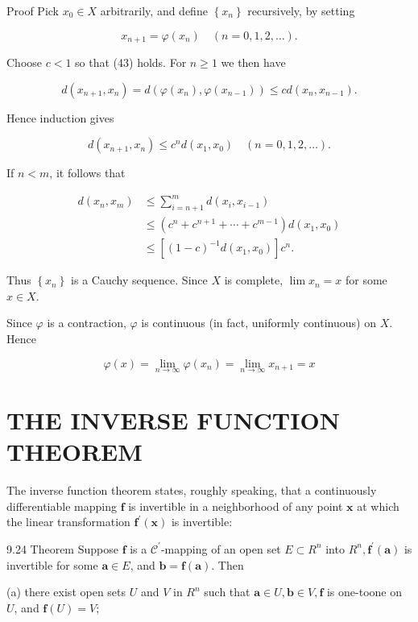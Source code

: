 \documentclass[10pt]{article}
\begin{document}
Proof Pick $x_{0} \in X$ arbitrarily, and define $\left\{x_{n}\right\}$ recursively, by setting

$$
x_{n+1}=\varphi\left(x_{n}\right) \quad(n=0,1,2, \ldots) .
$$

Choose $c<1$ so that (43) holds. For $n \geq 1$ we then have

$$
d\left(x_{n+1}, x_{n}\right)=d\left(\varphi\left(x_{n}\right), \varphi\left(x_{n-1}\right)\right) \leq c d\left(x_{n}, x_{n-1}\right) .
$$

Hence induction gives

$$
d\left(x_{n+1}, x_{n}\right) \leq c^{n} d\left(x_{1}, x_{0}\right) \quad(n=0,1,2, \ldots) .
$$

If $n<m$, it follows that

$$
\begin{aligned}
d\left(x_{n}, x_{m}\right) & \leq \sum_{i=n+1}^{m} d\left(x_{i}, x_{i-1}\right) \\
& \leq\left(c^{n}+c^{n+1}+\cdots+c^{m-1}\right) d\left(x_{1}, x_{0}\right) \\
& \leq\left[(1-c)^{-1} d\left(x_{1}, x_{0}\right)\right] c^{n} .
\end{aligned}
$$

Thus $\left\{x_{n}\right\}$ is a Cauchy sequence. Since $X$ is complete, $\lim x_{n}=x$ for some $x \in X$.

Since $\varphi$ is a contraction, $\varphi$ is continuous (in fact, uniformly continuous) on $X$. Hence

$$
\varphi(x)=\lim _{n \rightarrow \infty} \varphi\left(x_{n}\right)=\lim _{n \rightarrow \infty} x_{n+1}=x
$$

\section{THE INVERSE FUNCTION THEOREM}
The inverse function theorem states, roughly speaking, that a continuously differentiable mapping $\mathbf{f}$ is invertible in a neighborhood of any point $\mathbf{x}$ at which the linear transformation $\mathbf{f}^{\prime}(\mathbf{x})$ is invertible:

9.24 Theorem Suppose $\mathbf{f}$ is a $\mathscr{C}^{\prime}$-mapping of an open set $E \subset R^{n}$ into $R^{n}, \mathbf{f}^{\prime}(\mathbf{a})$ is invertible for some $\mathbf{a} \in E$, and $\mathbf{b}=\mathbf{f}(\mathbf{a})$. Then

(a) there exist open sets $U$ and $V$ in $R^{n}$ such that $\mathbf{a} \in U, \mathbf{b} \in V, \mathbf{f}$ is one-toone on $U$, and $\mathbf{f}(U)=V$;
\end{document}
